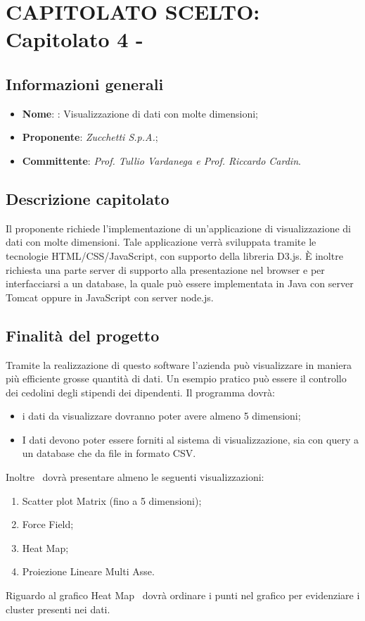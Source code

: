 \section{CAPITOLATO SCELTO: Capitolato 4 - \hd}
\subsection{Informazioni generali}
\begin{itemize}
    \item \textbf{Nome}: \hd: Visualizzazione di dati con molte dimensioni;
    \item \textbf{Proponente}: \emph{Zucchetti S.p.A.};
    \item \textbf{Committente}: \emph{Prof. Tullio Vardanega e Prof. Riccardo Cardin}.
\end{itemize}
\subsection{Descrizione capitolato}
Il proponente richiede l'implementazione di un'applicazione di visualizzazione di dati con molte dimensioni. Tale applicazione verrà sviluppata tramite le tecnologie HTML/CSS/JavaScript, con supporto della libreria D3.js. È inoltre richiesta una parte server di supporto alla presentazione nel browser e per interfacciarsi a un  database, la quale può essere implementata in Java con server Tomcat oppure in JavaScript con server node.js.
\subsection{Finalità del progetto}
Tramite la realizzazione di questo software l'azienda può visualizzare in maniera più efficiente grosse quantità di dati. Un esempio pratico può essere il controllo dei cedolini degli stipendi dei dipendenti. Il programma dovrà:
\begin{itemize}
    \item i dati da visualizzare dovranno poter avere almeno 5 dimensioni;
    \item I dati devono poter essere forniti al sistema di visualizzazione, sia con query a un database che da file in formato CSV.
\end{itemize}
Inoltre \hd\ dovrà presentare almeno le seguenti visualizzazioni:
\begin{enumerate}
	\item Scatter plot Matrix (fino a 5 dimensioni);
	\item Force Field;
	\item Heat Map;
	\item Proiezione Lineare Multi Asse.
\end{enumerate}
Riguardo al grafico Heat Map \hd\ dovrà ordinare i punti nel grafico per evidenziare i cluster presenti nei dati.
